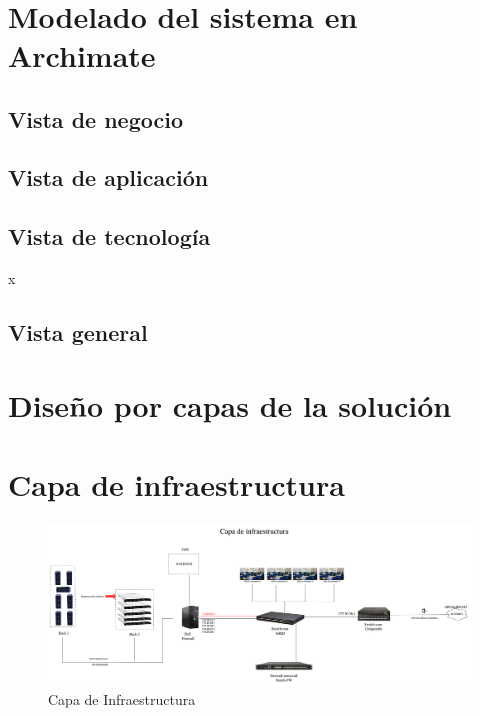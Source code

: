 \label{cap:disenio}
\mbox{}\\
\section{Modelado del sistema en Archimate}

\subsection{Vista de negocio}


\subsection{Vista de aplicación}


\subsection{Vista de tecnología}
x


\subsection{Vista general}


\section{Diseño por capas de la solución}

\section{Capa de infraestructura}

\begin{figure}[H]
    \centering
    \includegraphics[width=\textwidth]{tablas-images/cp6/disenio-N1.png}
    \caption{Capa de Infraestructura}
\end{figure}

